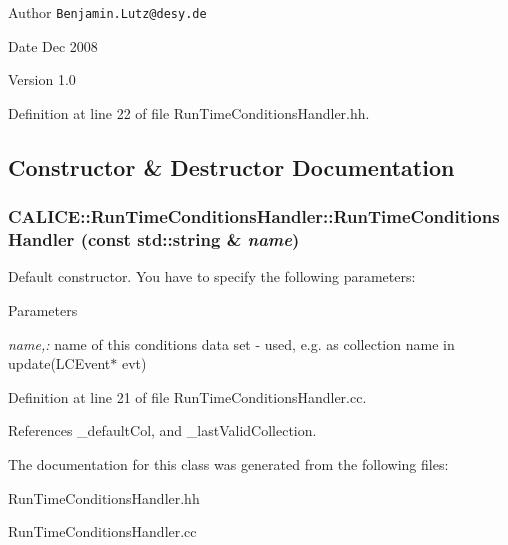 \begin{DoxyAuthor}{Author}
{\tt Benjamin.Lutz@desy.de} 
\end{DoxyAuthor}
\begin{DoxyDate}{Date}
Dec 2008 
\end{DoxyDate}
\begin{DoxyVersion}{Version}
1.0 
\end{DoxyVersion}


Definition at line 22 of file RunTimeConditionsHandler.hh.

\subsection{Constructor \& Destructor Documentation}
\subsubsection[{RunTimeConditionsHandler}]{\setlength{\rightskip}{0pt plus 5cm}CALICE::RunTimeConditionsHandler::RunTimeConditionsHandler (const std::string \& {\em name})}\label{classCALICE_1_1RunTimeConditionsHandler_a00f0851171a0e2294317f8fed106033b}


Default constructor. You have to specify the following parameters:


\begin{DoxyParams}{Parameters}
\item[{\em name,:}]name of this conditions data set -\/ used, e.g. as collection name in update(LCEvent$\ast$ evt) \end{DoxyParams}


Definition at line 21 of file RunTimeConditionsHandler.cc.

References \_\-defaultCol, and \_\-lastValidCollection.

The documentation for this class was generated from the following files:\begin{DoxyCompactItemize}
\item 
RunTimeConditionsHandler.hh\item 
RunTimeConditionsHandler.cc\end{DoxyCompactItemize}
